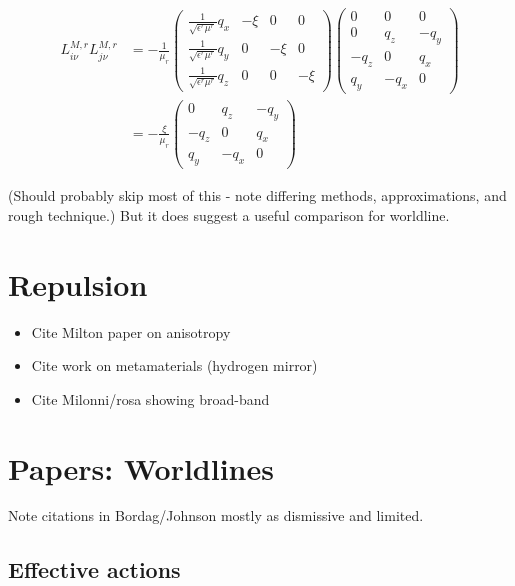 \begin{align}
  L^{M,r}_{i\nu}L^{M,r}_{j\nu} &= -
   \frac{1}{\mu_r}
 \left( \begin{array}{cccc} 
      \frac{1}{\sqrt{\epsilon^r\mu^r}}q_x & -\xi & 0 & 0\\
      \frac{1}{\sqrt{\epsilon^r\mu^r}}q_y & 0 &-\xi & 0\\
      \frac{1}{\sqrt{\epsilon^r\mu^r}}q_z & 0 & 0 & -\xi
    \end{array}
  \right)
\left( \begin{array}{cccc} 
      0 & 0 &  0\\
      0 & q_z & -q_y\\
      -q_z & 0 & q_x\\
      q_y & -q_x & 0
    \end{array}
  \right)\\
&=-\frac{\xi}{\mu_r} \left( \begin{array}{ccc} 
      0 & q_z & -q_y\\
      -q_z & 0 & q_x\\
      q_y & -q_x & 0
    \end{array}
  \right)
\end{align}

(Should probably skip most of this - note differing methods, approximations, and rough technique.)
But it does suggest a useful comparison for worldline.  


\section{Repulsion}

\begin{itemize}
\item Cite Milton paper on anisotropy \cite{Milton2012, Milton2012a}
\item Cite work on metamaterials (hydrogen mirror)
\item Cite Milonni/rosa showing broad-band \cite{Rosa2010}
\end{itemize}

\section{Papers: Worldlines}

Note citations in Bordag/Johnson mostly as dismissive and limited.  

\subsection{Effective actions}

